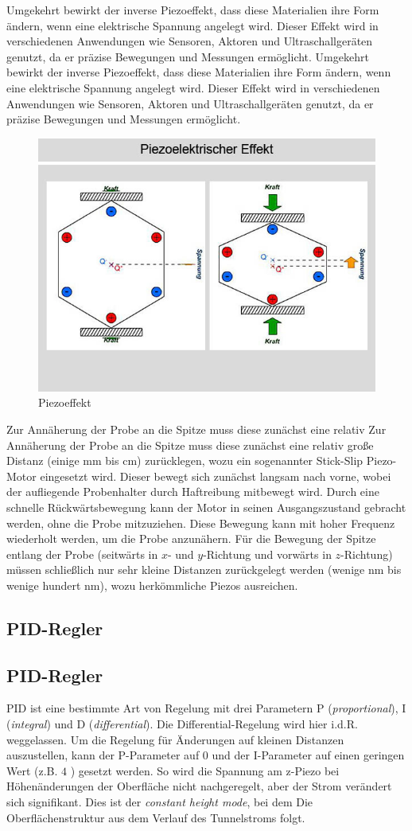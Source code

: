 \documentclass{article}
\begin{document}
Umgekehrt bewirkt der inverse Piezoeffekt, dass diese Materialien ihre Form ändern, wenn eine elektrische Spannung angelegt wird.
Dieser Effekt wird in verschiedenen Anwendungen wie Sensoren, Aktoren und Ultraschallgeräten genutzt, da er präzise Bewegungen und Messungen ermöglicht.
Umgekehrt bewirkt der inverse Piezoeffekt, dass diese Materialien ihre Form ändern, wenn eine elektrische Spannung angelegt wird.
Dieser Effekt wird in verschiedenen Anwendungen wie Sensoren, Aktoren und Ultraschallgeräten genutzt, da er präzise Bewegungen und Messungen ermöglicht.

\begin{figure}[h!]
    \centering
    \includegraphics[width=0.5\linewidth]{figure/piezo_effekt.jpg}
    \caption{Piezoeffekt}
    \label{fig:piezoelektrische}
\end{figure}

Zur Annäherung der Probe an die Spitze muss diese zunächst eine relativ 
Zur Annäherung der Probe an die Spitze muss diese zunächst eine relativ 
große Distanz (einige \si{\mm} bis \si{cm}) zurücklegen, wozu ein sogenannter Stick-Slip
Piezo-Motor eingesetzt wird. Dieser bewegt sich zunächst langsam nach vorne, wobei
der aufliegende Probenhalter durch Haftreibung mitbewegt wird. Durch eine schnelle
Rückwärtsbewegung kann der Motor in seinen Ausgangszustand gebracht werden, ohne die
Probe mitzuziehen. Diese Bewegung kann mit hoher Frequenz wiederholt werden, um die Probe anzunähern.
Für die Bewegung der Spitze entlang der Probe (seitwärts in $x$- und $y$-Richtung und
vorwärts in $z$-Richtung) müssen schließlich nur sehr kleine Distanzen zurückgelegt
werden (wenige \si{nm} bis wenige hundert \si{\nm}), wozu herkömmliche Piezos ausreichen.

\subsection*{PID-Regler}
\subsection*{PID-Regler}
PID ist eine bestimmte Art von Regelung mit drei Parametern P (\textit{proportional}), I (\textit{integral}) und D (\textit{differential}).
Die Differential-Regelung wird hier i.d.R. weggelassen. Um die Regelung für Änderungen auf kleinen Distanzen auszustellen, kann der P-Parameter auf $0$ und
der I-Parameter auf einen geringen Wert (z.B. $4$ \cite{Anleitung}) gesetzt werden.
So wird die Spannung am z-Piezo bei Höhenänderungen der Oberfläche nicht nachgeregelt,
aber der Strom verändert sich signifikant. Dies ist der \textit{constant height mode},
bei dem Die Oberflächenstruktur aus dem Verlauf des Tunnelstroms folgt.\\
\end{document}
